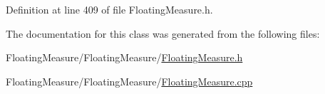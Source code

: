 Definition at line 409 of file Floating\+Measure.\+h.



The documentation for this class was generated from the following files\+:\begin{DoxyCompactItemize}
\item 
Floating\+Measure/\+Floating\+Measure/\hyperlink{FloatingMeasure_8h}{Floating\+Measure.\+h}\item 
Floating\+Measure/\+Floating\+Measure/\hyperlink{FloatingMeasure_8cpp}{Floating\+Measure.\+cpp}\end{DoxyCompactItemize}
